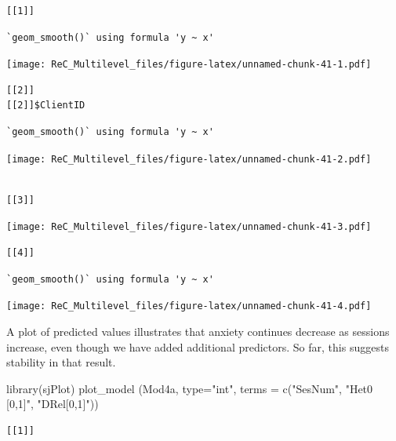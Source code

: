 \documentclass[
  english,
]{book}
\newenvironment{Shaded}{\begin{snugshade}}{\end{snugshade}}
\newcommand{\AttributeTok}[1]{\textcolor[rgb]{0.77,0.63,0.00}{#1}}
\newcommand{\FunctionTok}[1]{\textcolor[rgb]{0.00,0.00,0.00}{#1}}
\newcommand{\NormalTok}[1]{#1}
\newcommand{\StringTok}[1]{\textcolor[rgb]{0.31,0.60,0.02}{#1}}
\begin{document}
\begin{verbatim}
[[1]]
\end{verbatim}

\begin{verbatim}
`geom_smooth()` using formula 'y ~ x'
\end{verbatim}

\texttt{[image: ReC\_Multilevel\_files/figure-latex/unnamed-chunk-41-1.pdf]}

\begin{verbatim}
[[2]]
[[2]]$ClientID
\end{verbatim}

\begin{verbatim}
`geom_smooth()` using formula 'y ~ x'
\end{verbatim}

\texttt{[image: ReC\_Multilevel\_files/figure-latex/unnamed-chunk-41-2.pdf]}

\begin{verbatim}

[[3]]
\end{verbatim}

\texttt{[image: ReC\_Multilevel\_files/figure-latex/unnamed-chunk-41-3.pdf]}

\begin{verbatim}
[[4]]
\end{verbatim}

\begin{verbatim}
`geom_smooth()` using formula 'y ~ x'
\end{verbatim}

\texttt{[image: ReC\_Multilevel\_files/figure-latex/unnamed-chunk-41-4.pdf]}

A plot of predicted values illustrates that anxiety continues decrease as sessions increase, even though we have added additional predictors. So far, this suggests stability in that result.

\begin{Shaded}
\begin{Highlighting}[]
\FunctionTok{library}\NormalTok{(sjPlot)}
\FunctionTok{plot\_model}\NormalTok{ (Mod4a, }\AttributeTok{type=}\StringTok{"int"}\NormalTok{, }\AttributeTok{terms =} \FunctionTok{c}\NormalTok{(}\StringTok{"SesNum"}\NormalTok{, }\StringTok{"Het0 [0,1]"}\NormalTok{, }\StringTok{"DRel[0,1]"}\NormalTok{))}
\end{Highlighting}
\end{Shaded}

\begin{verbatim}
[[1]]
\end{verbatim}
\end{document}
